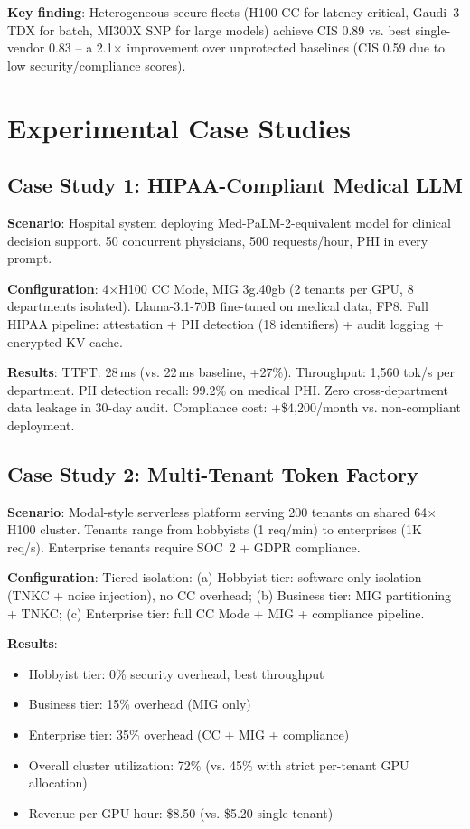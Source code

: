\documentclass[conference,10pt]{IEEEtran}
\begin{document}
\textbf{Key finding}: Heterogeneous secure fleets (H100 CC for latency-critical, Gaudi~3 TDX for batch, MI300X SNP for large models) achieve CIS 0.89 vs. best single-vendor 0.83 -- a 2.1$\times$ improvement over unprotected baselines (CIS 0.59 due to low security/compliance scores).

\section{Experimental Case Studies}
\label{sec:cases}

\subsection{Case Study 1: HIPAA-Compliant Medical LLM}

\textbf{Scenario}: Hospital system deploying Med-PaLM-2-equivalent model for clinical decision support. 50 concurrent physicians, 500 requests/hour, PHI in every prompt.

\textbf{Configuration}: 4$\times$H100 CC Mode, MIG 3g.40gb (2 tenants per GPU, 8 departments isolated). Llama-3.1-70B fine-tuned on medical data, FP8. Full HIPAA pipeline: attestation + PII detection (18 identifiers) + audit logging + encrypted KV-cache.

\textbf{Results}: TTFT: 28\,ms (vs. 22\,ms baseline, +27\%). Throughput: 1,560 tok/s per department. PII detection recall: 99.2\% on medical PHI. Zero cross-department data leakage in 30-day audit. Compliance cost: +\$4,200/month vs. non-compliant deployment.

\subsection{Case Study 2: Multi-Tenant Token Factory}

\textbf{Scenario}: Modal-style serverless platform serving 200 tenants on shared 64$\times$H100 cluster. Tenants range from hobbyists (1 req/min) to enterprises (1K req/s). Enterprise tenants require SOC~2 + GDPR compliance.

\textbf{Configuration}: Tiered isolation: (a) Hobbyist tier: software-only isolation (TNKC + noise injection), no CC overhead; (b) Business tier: MIG partitioning + TNKC; (c) Enterprise tier: full CC Mode + MIG + compliance pipeline.

\textbf{Results}:
\begin{itemize}
\item Hobbyist tier: 0\% security overhead, best throughput
\item Business tier: 15\% overhead (MIG only)
\item Enterprise tier: 35\% overhead (CC + MIG + compliance)
\item Overall cluster utilization: 72\% (vs. 45\% with strict per-tenant GPU allocation)
\item Revenue per GPU-hour: \$8.50 (vs. \$5.20 single-tenant)
\end{itemize}
\end{document}
